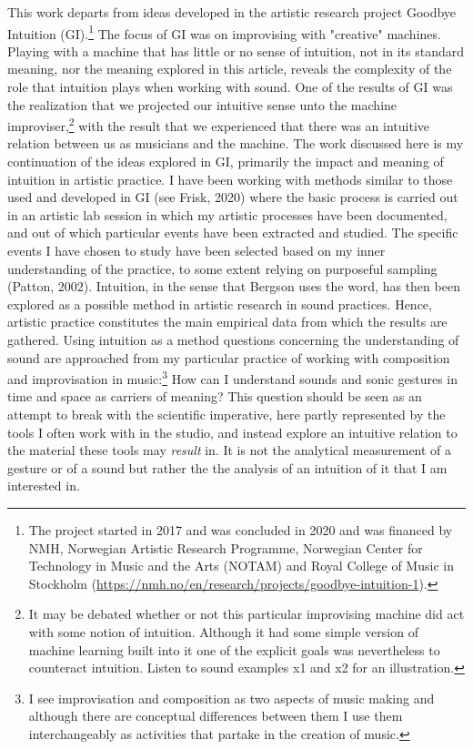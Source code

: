 \documentclass[11pt]{article}
\makeatletter
\newcommand{\cslcitation}[2]
 {\protect\hyper@linkstart{cite}{citeproc_bib_item_#1}#2\hyper@linkend}
\makeatother
\begin{document}
This work departs from ideas developed in the artistic research project Goodbye Intuition (GI).\footnote{The project started in 2017 and was concluded in 2020 and was financed by NMH, Norwegian Artistic Research Programme, Norwegian Center for Technology in Music and the Arts (NOTAM) and Royal College of Music in Stockholm (\url{https://nmh.no/en/research/projects/goodbye-intuition-1}).}
The focus of GI was on improvising with "creative" machines.
Playing with a machine that has little or no sense of intuition, not in its standard meaning, nor the meaning explored in this article, reveals the complexity of the role that intuition plays when working with sound.
One of the results of GI was the realization that we projected our  intuitive sense unto the machine improviser,\footnote{It may be debated whether or not this particular improvising machine did act with some notion of intuition. Although it had some simple version of machine learning built into it one of the explicit goals was nevertheless to counteract intuition. Listen to sound examples x1 and x2 for an illustration.} with the result that we experienced that there was an intuitive relation between us as musicians and the machine.
The work discussed here is my  continuation of the ideas explored in GI, primarily the impact and meaning of intuition in artistic practice.
I have been working with methods similar to those used and developed in GI (see \cslcitation{15}{Frisk, 2020}) where the basic process is carried out in an artistic lab session in which my  artistic processes have been documented, and out of which particular events have been extracted and studied.
The specific events I have chosen to study have been selected based on my  inner understanding of the practice, to some extent relying on purposeful sampling (\cslcitation{27}{Patton, 2002}).
Intuition, in the sense that Bergson uses the word, has then been explored as a possible method in artistic research in sound practices.
Hence, artistic practice constitutes the main empirical data from which the results are gathered.
Using intuition as a method questions concerning the understanding of sound are approached from my particular practice of working with composition and improvisation in music:\footnote{I see improvisation and composition as two aspects of music making and although there are conceptual differences between them I use them interchangeably as activities that partake in the creation of music.}
How can I understand sounds and sonic gestures in time and space as carriers of meaning?
This question should be seen as an attempt to break with the scientific imperative, here partly represented by the tools I often work with in the studio, and instead explore an intuitive relation to the material these tools may \emph{result} in.
It is not the analytical measurement of a gesture or of a sound but rather the the analysis of an intuition of it that I am interested in.
\end{document}
